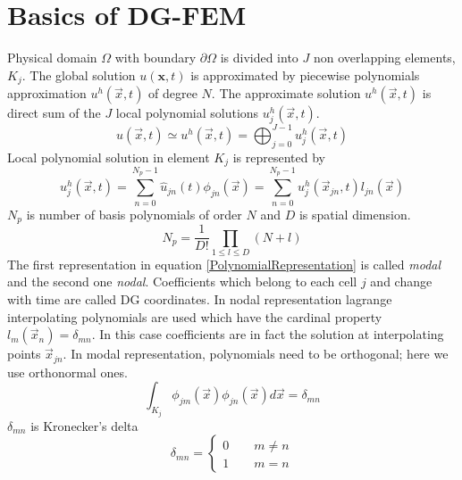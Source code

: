 \documentclass[BoSSSForSolvingConservationLaws.tex]{subfiles}
\begin{document}
\section{Basics of DG-FEM}
Physical domain $\Omega$ with boundary $\partial\Omega$ is divided into $J$ non overlapping elements, $K_j$. The global solution $u(\mathbf{x},t)$ is approximated by piecewise polynomials approximation $u^h(\vec{x},t)$ of degree $N$. The approximate solution $u^h(\vec{x},t)$ is direct sum of the $J$ local polynomial solutions $u_j^h(\vec{x},t)$.\\
\begin{equation}
\label{ApproximateSolution}
  u(\vec{x},t)\simeq u^h(\vec{x},t)=\bigoplus_{j=0}^{J-1} u_j^h(\vec{x},t)
\end{equation}
Local polynomial solution in element $K_j$ is represented by\\
\begin{equation}
\label{PolynomialRepresentation}
u_j^h(\vec{x},t)=\sum_{n=0}^{N_p-1} \hat u_{jn}(t) \phi_{jn}(\vec{x})=\sum_{n=0}^{N_p-1} u_j^h(\vec{x}_{jn},t) l_{jn}(\vec{x})
\end{equation}
$N_p$ is number of basis polynomials of order $N$ and $D$ is spatial dimension.\\
\[
N_p=\frac{1}{D!}\prod_{1\le l \le D}(N+l)
\]
The first representation in equation \eqref{PolynomialRepresentation} is called \emph{modal} and the second one \emph{nodal}. Coefficients which belong to each cell $j$ and change with time are called DG coordinates. In nodal representation lagrange interpolating polynomials are used which have the cardinal property $l_m(\vec{x}_n)=\delta_{mn}$. In this case coefficients are in fact the solution at interpolating points $\vec{x}_{jn}$. In modal representation, polynomials need to be orthogonal; here we use orthonormal ones.\\
\[
\int_{K_j} \phi_{jm}(\vec{x}) \phi_{jn}(\vec{x}) d\vec{x}=\delta_{mn}
\]
$\delta_{mn}$ is Kronecker's delta\\
\[
\delta_{mn}=
\begin{cases}
  0 \qquad m\neq n \\
  1 \qquad m=n
\end{cases}
\]
\end{document}
